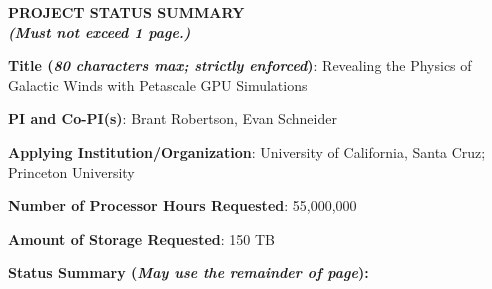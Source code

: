 \documentclass[11pt,letterpaper,english]{article}
\begin{document}
\setlength{\parindent}{0in} %

\pagestyle{fancy}   \renewcommand{%
\headrulewidth}{0.0pt}

\begin{center}
\bf \large {PROJECT STATUS SUMMARY} \\
{\bf \small {\em (Must not exceed 1 page.)}}
\end{center}



\textbf{Title (\emph{80 characters max; strictly enforced})}: Revealing the Physics of Galactic Winds with Petascale GPU Simulations \smallskip

\textbf{PI and Co-PI(s)}: Brant Robertson, Evan Schneider \smallskip

\textbf{Applying Institution/Organization}: University of California, Santa Cruz; Princeton University \smallskip

\textbf{Number of Processor Hours Requested}: 55,000,000 \smallskip

\textbf{Amount of Storage Requested}: 150 TB \smallskip

\textbf{Status Summary ({\emph{May use the remainder of page}}):} \\

\vspace{.15in}


\end{document}
